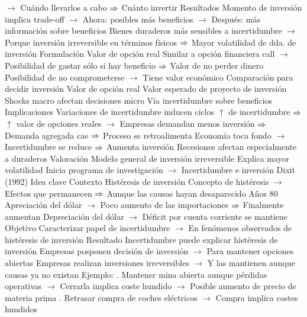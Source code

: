 \documentclass{nuevotema}
\begin{document}
\begin{esquemal}
				\4[] $\to$ Cuándo llevarlos a cabo
				\4[] $\Rightarrow$ Cuánto invertir
				\4 Resultados
				\4[] Momento de inversión implica trade-off
				\4[] $\to$ Ahora: posibles más beneficios
				\4[] $\to$ Después: más información sobre beneficios
				\4[] Bienes duraderos más sensibles a incertidumbre
				\4[] $\to$ Porque inversión irreversible en términos físicos
				\4[] $\Rightarrow$ Mayor volatilidad de dda. de inversión
			\3 Formulación
				\4 Valor de opción real
				\4[] Similar a opción financiera call
				\4[] $\to$ Posibilidad de gastar sólo si hay beneficio
				\4[] $\Rightarrow$ Valor de no perder dinero
				\4[] Posibilidad de no comprometerse
				\4[] $\to$ Tiene valor económico
				\4 Comparación para decidir inversión
				\4[] Valor de opción real
				\4[] Valor esperado de proyecto de inversión
				\4 Shocks macro afectan decisiones micro
				\4[] Vía incertidumbre sobre beneficios
			\3 Implicaciones
				\4 Variaciones de incertidumbre inducen ciclos
				\4[] $\uparrow$ de incertidumbre $\Rightarrow$ $\uparrow$ valor de opciones reales
				\4[] $\to$ Empresas demandan menos inversión
				\4[] $\Rightarrow$ Demanda agregada cae
				\4[] $\Rightarrow$ Proceso se retroalimenta
				\4[] Economía toca fondo
				\4[] $\to$ Incertidumbre se reduce
				\4[] $\Rightarrow$ Aumenta inversión
				\4 Recesiones afectan especialmente a duraderos
			\3 Valoración
				\4 Modelo general de inversión irreversible
				\4 Explica mayor volatilidad
				\4 Inicia programa de investigación
				\4[] $\to$ Incertidumbre e inversión
		\2 Dixit (1992)
			\3 Idea clave
				\4 Contexto
				\4[] Histéresis de inversión
				\4[] Concepto de histéresis
				\4[] $\to$ Efectos que permanecen
				\4[] $\Rightarrow$ Aunque las causas hayan desaparecido
				\4[] Años 80
				\4[] Apreciación del dólar
				\4[] $\to$ Poco aumento de las importaciones
				\4[] $\Rightarrow$ Finalmente aumentan
				\4[] Depreciación del dólar
				\4[] $\to$ Déficit por cuenta corriente se mantiene
				\4 Objetivo
				\4[] Caracterizar papel de incertidumbre
				\4[] $\to$ En fenómenos observados de histéresis de inversión
				\4 Resultado
				\4[] Incertidumbre puede explicar histéresis de inversión
				\4[] Empresas posponen decisión de inversión
				\4[] $\to$ Para mantener opciones abiertas
				\4[] Empresas realizan inversiones irreversibles
				\4[] $\to$ Y las mantienen aunque causas ya no existan
				\4[] Ejemplo:
				. Mantener mina abierta aunque pérdidas operativas
				\4[] $\to$ Cerrarla implica coste hundido
				\4[] $\to$ Posible aumento de precio de materia prima
				. Retrasar compra de coches eléctricos
				\4[] $\to$ Compra implica costes hundidos

\end{esquemal}
\end{document}
